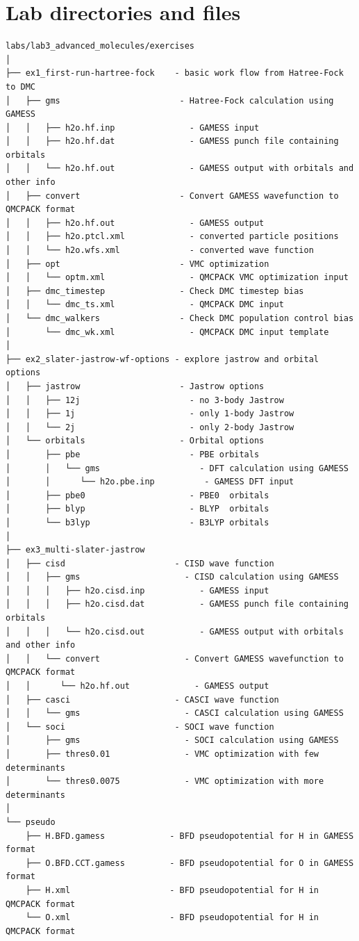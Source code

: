 \section{Lab directories and files}
\footnotesize
\begin{verbatim}
labs/lab3_advanced_molecules/exercises
│    
├── ex1_first-run-hartree-fock    - basic work flow from Hatree-Fock to DMC
│   ├── gms                        - Hatree-Fock calculation using GAMESS
│   │   ├── h2o.hf.inp               - GAMESS input
│   │   ├── h2o.hf.dat               - GAMESS punch file containing orbitals
│   │   └── h2o.hf.out               - GAMESS output with orbitals and other info
│   ├── convert                    - Convert GAMESS wavefunction to QMCPACK format
│   │   ├── h2o.hf.out               - GAMESS output
│   │   ├── h2o.ptcl.xml             - converted particle positions
│   │   └── h2o.wfs.xml              - converted wave function
│   ├── opt                        - VMC optimization
│   │   └── optm.xml                 - QMCPACK VMC optimization input
│   ├── dmc_timestep               - Check DMC timestep bias
│   │   └── dmc_ts.xml               - QMCPACK DMC input
│   └── dmc_walkers                - Check DMC population control bias
│       └── dmc_wk.xml               - QMCPACK DMC input template
│   
├── ex2_slater-jastrow-wf-options - explore jastrow and orbital options
│   ├── jastrow                    - Jastrow options
│   │   ├── 12j                      - no 3-body Jastrow
│   │   ├── 1j                       - only 1-body Jastrow
│   │   └── 2j                       - only 2-body Jastrow
│   └── orbitals                   - Orbital options
│       ├── pbe                      - PBE orbitals
│       │   └── gms                    - DFT calculation using GAMESS
│       │      └── h2o.pbe.inp          - GAMESS DFT input
│       ├── pbe0                     - PBE0  orbitals
│       ├── blyp                     - BLYP  orbitals
│       └── b3lyp                    - B3LYP orbitals
│       
├── ex3_multi-slater-jastrow
│   ├── cisd                      - CISD wave function
│   │   ├── gms                     - CISD calculation using GAMESS
│   │   │   ├── h2o.cisd.inp           - GAMESS input
│   │   │   ├── h2o.cisd.dat           - GAMESS punch file containing orbitals
│   │   │   └── h2o.cisd.out           - GAMESS output with orbitals and other info
│   │   └── convert                 - Convert GAMESS wavefunction to QMCPACK format
│   │      └── h2o.hf.out             - GAMESS output
│   ├── casci                     - CASCI wave function
│   │   └── gms                     - CASCI calculation using GAMESS
│   └── soci                      - SOCI wave function
│       ├── gms                     - SOCI calculation using GAMESS
│       ├── thres0.01               - VMC optimization with few determinants
│       └── thres0.0075             - VMC optimization with more determinants
│   
└── pseudo
    ├── H.BFD.gamess             - BFD pseudopotential for H in GAMESS format
    ├── O.BFD.CCT.gamess         - BFD pseudopotential for O in GAMESS format
    ├── H.xml                    - BFD pseudopotential for H in QMCPACK format
    └── O.xml                    - BFD pseudopotential for H in QMCPACK format
\end{verbatim}
\normalsize


